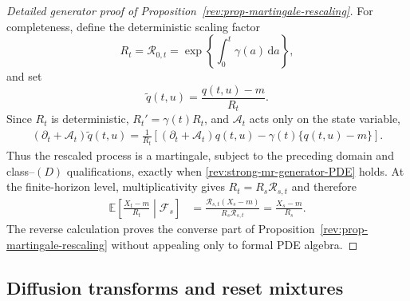 \documentclass[11pt]{article}
\theoremstyle{remark}
\newcommand{\E}{\mathbb E}
\newcommand{\dd}{\,\mathrm d}
\begin{document}
\begin{proof}[Detailed generator proof of
Proposition~\ref{rev:prop-martingale-rescaling}]
For completeness, define the deterministic scaling factor
\[
R_t=\mathcal R_{0,t}=\exp\!\left\{\int_0^t\gamma(a)\dd a\right\},
\]
and set
\[
\widetilde q(t,u)=\frac{q(t,u)-m}{R_t}.
\]
Since $R_t$ is deterministic, $R_t'=\gamma(t)R_t$, and
$\mathcal A_t$ acts only on the state variable,
\begin{align}
(\partial_t+\mathcal A_t)\widetilde q(t,u)
=\frac{1}{R_t}
\left[(\partial_t+\mathcal A_t)q(t,u)
-\gamma(t)\{q(t,u)-m\}\right].
\label{rev:app-rescaled-generator}
\end{align}
Thus the rescaled process is a martingale, subject to the preceding domain and
class--$(D)$ qualifications, exactly when
\eqref{rev:strong-mr-generator-PDE} holds.  At the finite-horizon level,
multiplicativity gives $R_t=R_s\mathcal R_{s,t}$ and therefore
\begin{align*}
\E\!\left[\frac{X_t-m}{R_t}\middle|\mathcal F_s\right]
&=\frac{\mathcal R_{s,t}(X_s-m)}{R_s\mathcal R_{s,t}}
=\frac{X_s-m}{R_s}.
\end{align*}
The reverse calculation proves the converse part of
Proposition~\ref{rev:prop-martingale-rescaling} without appealing only to formal PDE
algebra.
\end{proof}

\subsection{Diffusion transforms and reset mixtures}
\label{rev:app-transform-reset-proofs}
\end{document}
